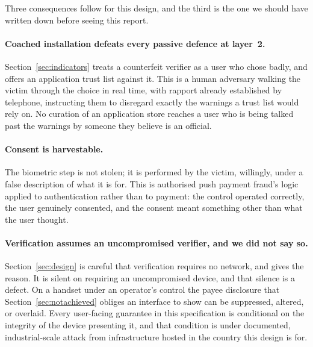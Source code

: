 \documentclass[10pt,a4paper,twocolumn]{article}
\begin{document}
Three consequences follow for this design, and the third is the one we should
have written down before seeing this report.

\paragraph{Coached installation defeats every passive defence at layer~2.}
Section~\ref{sec:indicators} treats a counterfeit verifier as a user who chose
badly, and offers an application trust list against it. This is a human
adversary walking the victim through the choice in real time, with rapport
already established by telephone, instructing them to disregard exactly the
warnings a trust list would rely on. No curation of an application store reaches
a user who is being talked past the warnings by someone they believe is an
official.

\paragraph{Consent is harvestable.}
The biometric step is not stolen; it is performed by the victim, willingly, under
a false description of what it is for. This is authorised push payment fraud's
logic applied to authentication rather than to payment: the control operated
correctly, the user genuinely consented, and the consent meant something other
than what the user thought.

\paragraph{Verification assumes an uncompromised verifier, and we did not say so.}
Section~\ref{sec:design} is careful that verification requires no network, and
gives the reason. It is silent on requiring an uncompromised device, and that
silence is a defect. On a handset under an operator's control the payee
disclosure that Section~\ref{sec:notachieved} obliges an interface to show can be
suppressed, altered, or overlaid. Every user-facing guarantee in this
specification is conditional on the integrity of the device presenting it, and
that condition is under documented, industrial-scale attack from infrastructure
hosted in the country this design is for.
\end{document}
